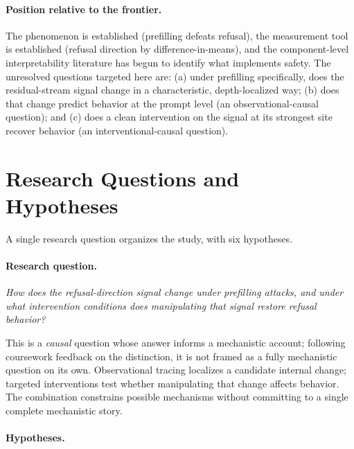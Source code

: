 \documentclass{article}
\begin{document}
\paragraph{Position relative to the frontier.}
The phenomenon is established (prefilling defeats refusal), the measurement
tool is established (refusal direction by difference-in-means), and the
component-level interpretability literature has begun to identify what
implements safety. The unresolved questions targeted here are: (a) under
prefilling specifically, does the residual-stream signal change in a
characteristic, depth-localized way; (b) does that change predict behavior
at the prompt level (an observational-causal question); and (c) does a
clean intervention on the signal at its strongest site recover behavior
(an interventional-causal question).

\section{Research Questions and Hypotheses}
\label{sec:rqs}

A single research question organizes the study, with six hypotheses.

\paragraph{Research question.}
\emph{How does the refusal-direction signal change under prefilling
attacks, and under what intervention conditions does manipulating that
signal restore refusal behavior?}

This is a \emph{causal} question whose answer informs a mechanistic
account; following coursework feedback on the distinction, it is not
framed as a fully mechanistic question on its own. Observational tracing
localizes a candidate internal change; targeted interventions test
whether manipulating that change affects behavior. The combination
constrains possible mechanisms without committing to a single complete
mechanistic story.

\paragraph{Hypotheses.}
\end{document}

